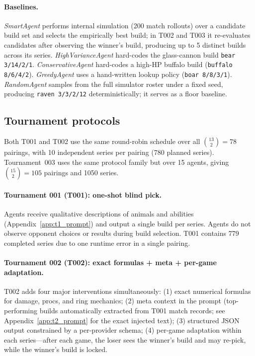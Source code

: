 \documentclass[11pt]{article}
\newcommand{\tOne}{T001}
\newcommand{\tTwo}{T002}
\newcommand{\tThree}{T003}
\begin{document}
\paragraph{Baselines.}
\emph{SmartAgent} performs internal simulation (200 match rollouts) over a candidate build set and selects the empirically best build; in \tTwo{} and \tThree{} it re-evaluates candidates after observing the winner's build, producing up to 5 distinct builds across its series.
\emph{HighVarianceAgent} hard-codes the glass-cannon build \texttt{bear 3/14/2/1}.
\emph{ConservativeAgent} hard-codes a high-HP buffalo build (\texttt{buffalo 8/6/4/2}).
\emph{GreedyAgent} uses a hand-written lookup policy (\texttt{boar 8/8/3/1}).
\emph{RandomAgent} samples from the full simulator roster under a fixed seed, producing \texttt{raven 3/3/2/12} deterministically; it serves as a floor baseline.

\subsection{Tournament protocols}

Both \tOne{} and \tTwo{} use the same round-robin schedule over all $\binom{13}{2}=78$ pairings, with 10 independent series per pairing (780 planned series).
Tournament~003 uses the same protocol family but over 15 agents, giving $\binom{15}{2}=105$ pairings and 1050 series.

\paragraph{Tournament 001 (\tOne): one-shot blind pick.}
Agents receive qualitative descriptions of animals and abilities (Appendix~\ref{app:t1_prompt}) and output a single build per series.
Agents do not observe opponent choices or results during build selection.
\tOne{} contains 779 completed series due to one runtime error in a single pairing.

\paragraph{Tournament 002 (\tTwo): exact formulas + meta + per-game adaptation.}
\tTwo{} adds four major interventions simultaneously:
(1) exact numerical formulas for damage, procs, and ring mechanics;
(2) meta context in the prompt (top-performing builds automatically extracted from \tOne{} match records; see Appendix~\ref{app:t2_prompt} for the exact injected text);
(3) structured JSON output constrained by a per-provider schema;
(4) per-game adaptation within each series---after each game, the loser sees the winner's build and may re-pick, while the winner's build is locked.
\end{document}
